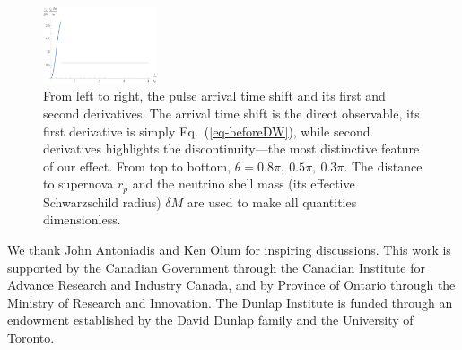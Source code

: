 \documentclass[aps,showpacs,onecolumn,floats,prd,superscriptaddress,nofootinbib]{revtex4}
\begin{document}
\begin{figure}[t]
\includegraphics[width=0.3\textwidth]{3a}
\caption{From left to right, the pulse arrival time shift and its first and second derivatives. The arrival time shift is the direct observable, its first derivative is simply Eq.~(\ref{eq-beforeDW}), while second derivatives highlights the discontinuity---the most distinctive feature of our effect. From top to bottom, $\theta=0.8\pi, \ 0.5\pi, \ 0.3\pi$. The distance to supernova $r_p$ and the neutrino shell mass (its effective Schwarzschild radius) $\delta M$ are used to make all quantities dimensionless.}
\label{fig-3x3}
\end{figure}

\acknowledgments

We thank John Antoniadis and Ken Olum for inspiring discussions. This work is supported by the Canadian Government through the Canadian Institute for Advance Research and Industry Canada, and by Province of Ontario through the Ministry of Research and Innovation. The Dunlap Institute is funded through an endowment established by the David Dunlap family and the University of Toronto.

\appendix

%

\end{document}
